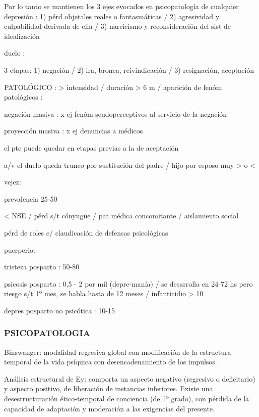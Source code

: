 \documentclass{scrbook}
\begin{document}
Por lo tanto se mantienen los 3 ejes evocados en psicopatología de cualquier depresión : 1) pérd objetales reales o fantasmáticas / 2) agresividad y culpabilidad derivada de ella / 3) narcicismo y reconsideración del sist de idealización

duelo :

3 etapas: 1) negación / 2) ira, bronca, reivindicación / 3) resignación, aceptación

PATOLÓGICO : > intensidad / duración > 6 m / aparición de fenóm patológicos :

negación masiva : x ej fenóm seudoperceptivos al servicio de la negación

proyección masiva : x ej denuncias a médicos

el pte puede quedar en etapas previas a la de aceptación

a/v el duelo queda trunco por sustitución del padre / hijo por esposo muy > o <

vejez:

prevalencia 25-50%

< NSE / pérd s/t cónyugue / pat médica concomitante / aislamiento social

pérd de roles c/ claudicación de defensas psicológicas

puerperio:

tristeza posparto : 50-80%

psicosis posparto : 0,5 - 2 por mil (depre-manía) / se desarrolla en 24-72 hs pero riesgo s/t 1º mes, se habla hasta de 12 meses / infanticidio > 10%

depres posparto no psicótica : 10-15%

\subsubsection*{PSICOPATOLOGIA}

Binswanger: modalidad regresiva global con modificación de la estructura temporal de la vida psíquica con desencadenamiento de los impulsos.

Análisis estructural de Ey: comporta un aspecto negativo (regresivo o deficitario) y aspecto positivo, de liberación de instancias inferiores. Existe una desestructuración ético-temporal de conciencia (de 1º grado), con pérdida de la capacidad de adaptación y moderación a las exigencias del presente.
\end{document}
